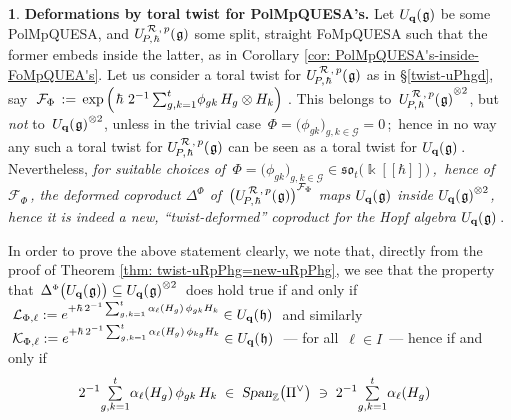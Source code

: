 \documentclass[12pt,reqno,twoside,a4paper]{amsart}
\numberwithin{equation}{section}
\theoremstyle{definition}
\newtheorem{free text}[lema]{}
\theoremstyle{remark}
\newcommand{\R}{{\mathcal R}}
\newcommand{\F}{{\mathcal F}}
\newcommand{\G}{{\mathcal G}}
\def \bq {\mathbf{q}}
\def \ZZ {\mathbb{Z}}
\def \kh{{\Bbbk[[\hbar]]}}
\def \G {\mathcal{G}}
\def \K {\mathcal{K}}
\def \L {\mathcal{L}}
\def \lieg{\mathfrak{g}}
\def \lieh{\mathfrak{h}}
\def \lieso{\mathfrak{so}}
\def \Phipicc {{\scriptscriptstyle \Phi}}
\def \uRpPhg{U^{\,\R\,,\,p}_{\!P,\hskip0,7pt\hbar}(\hskip0,5pt\lieg)}
\def \Ubqg {U_{\bq}(\hskip0,5pt\lieg)}
\def \Ubqh {U_{\bq}(\hskip0,5pt\lieh)}
\theoremstyle{plain}
\begin{document}
\begin{free text}  \label{twist-deform x PolMpQUESA's}
%
 \textbf{Deformations by toral twist for PolMpQUESA's.}
 Let  $ \Ubqg $  be some PolMpQUESA, and  $ \uRpPhg $  some split,
 straight FoMpQUESA such that the former embeds inside the latter,
 as in  Corollary \ref{cor: PolMpQUESA's-inside-FoMpQUEA's}.
 Let us consider a toral twist for  $ \uRpPhg $  as in  \S \ref{twist-uPhgd},  say
 $ \; \F_\Phi \, := \, \exp\Big(\hskip1pt \hbar \,  \, 2^{-1} \,
 {\textstyle \sum_{g,k=1}^t} \phi_{gk} \, H_g \otimes H_k \Big) \; $.
 This belongs to  $ \, {\uRpPhg}^{\otimes 2} $,  but  \textsl{not\/}  to
 $ \, {\Ubqg}^{\otimes 2} $,  unless in the trivial case
 $ \, \Phi = \big( \phi_{gk} \big)_{g, k \in \G} = 0 \, $;
 \,hence in no way any such a toral twist for  $ \uRpPhg $
 can be seen as a toral twist for  $ \Ubqg \, $.  Nevertheless,
 \textsl{for suitable choices of
 $ \, \Phi = \big( \phi_{gk} \big)_{g, k \in \G} \in \lieso_t\big(\kh\big) \, $,
 \,hence of  $ \F_\Phi \, $,  the deformed coproduct  $ \Delta^\Phipicc $  of
 $ \, {\big( \uRpPhg \big)}^{\F_\Phi} $  maps  $ \Ubqg $  inside
 $ {\Ubqg}^{\otimes 2} $,  hence it is indeed a new, ``twist-deformed''
 coproduct for the Hopf algebra  $ \Ubqg \, $}.
                                                          \par
   In order to prove the above statement clearly, we note that, directly
   from the proof of  Theorem \ref{thm: twist-uRpPhg=new-uRpPhg},
   we see that the property that
   $ \, \Delta^\Phipicc\big(\Ubqg\big) \subseteq {\Ubqg}^{\otimes 2} \, $
   does hold true if and only if
%
  $ \; \L_{\Phi, \ell} := e^{+ \hbar \, 2^{-1}
  \sum_{g,k=1}^t \alpha_\ell(H_g) \, \phi_{gk} H_k} \in \Ubqh \; $
and similarly
  $ \; \K_{\Phi,\ell} := e^{+ \hbar \, 2^{-1} \sum_{g,k=1}^t \alpha_\ell(H_g) \,
  \phi_{kg} H_k} \in \Ubqh \; $
%
 --- for all  $ \, \ell \in I \, $  ---   hence if and only if
%
%
\begin{equation}   \label{eq: integr-cond-twist}
%
   \hskip-7pt
 2^{-1} {\textstyle\sum\limits_{g,k=1}^t} \alpha_\ell(H_g) \,
 \phi_{gk} \, H_k  \; \in \; \textsl{Span}_\ZZ\big( \Pi^\vee \big)
 \; \ni \;   2^{-1} {\textstyle\sum\limits_{g,k=1}^t} \alpha_\ell(H_g)

\end{equation}
\end{free text}
\end{document}
